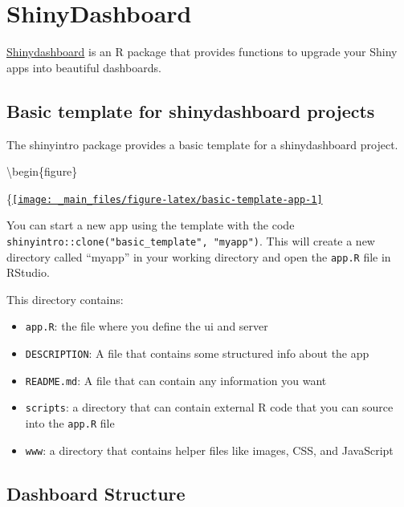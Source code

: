 \documentclass[
]{book}
\providecommand{\tightlist}{%
  \setlength{\itemsep}{0pt}\setlength{\parskip}{0pt}}
\begin{document}
\hypertarget{shinydashboard}{%
\chapter{ShinyDashboard}\label{shinydashboard}}

\href{https://rstudio.github.io/shinydashboard/}{Shinydashboard} is an R package that provides functions to upgrade your Shiny apps into beautiful dashboards.

\hypertarget{basic-template-for-shinydashboard-projects}{%
\section{Basic template for shinydashboard projects}\label{basic-template-for-shinydashboard-projects}}

The shinyintro package provides a basic template for a shinydashboard project.

\textbackslash begin\{figure\}

\{\centering \href{https://shiny.psy.gla.ac.uk/debruine/basic_template/}{\texttt{[image: \_main\_files/figure-latex/basic-template-app-1]} }

You can start a new app using the template with the code \texttt{shinyintro::clone("basic\_template",\ "myapp")}. This will create a new directory called ``myapp'' in your working directory and open the \texttt{app.R} file in RStudio.

This directory contains:

\begin{itemize}
\tightlist
\item
  \texttt{app.R}: the file where you define the ui and server
\item
  \texttt{DESCRIPTION}: A file that contains some structured info about the app
\item
  \texttt{README.md}: A file that can contain any information you want
\item
  \texttt{scripts}: a directory that can contain external R code that you can source into the \texttt{app.R} file
\item
  \texttt{www}: a directory that contains helper files like images, CSS, and JavaScript
\end{itemize}

\hypertarget{dashboard-structure}{%
\section{Dashboard Structure}\label{dashboard-structure}}
\end{document}
